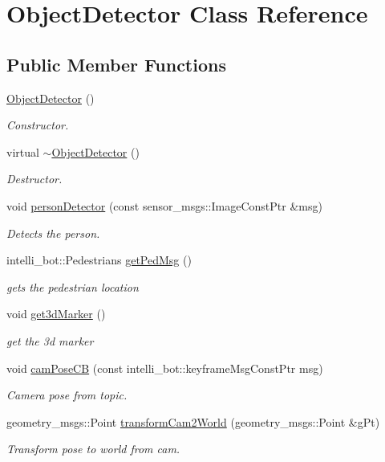 \hypertarget{class_object_detector}{}\section{Object\+Detector Class Reference}
\label{class_object_detector}
\subsection*{Public Member Functions}
\begin{DoxyCompactItemize}
\item 
\hyperlink{class_object_detector_a604cad611c81493d4e376b3d1fe186f3}{Object\+Detector} ()
\begin{DoxyCompactList}\small\item\em Constructor. \end{DoxyCompactList}\item 
virtual \hyperlink{class_object_detector_abb6cdeb1969ccb681c424663fb687fe8}{$\sim$\+Object\+Detector} ()
\begin{DoxyCompactList}\small\item\em Destructor. \end{DoxyCompactList}\item 
void \hyperlink{class_object_detector_a9cd06c7452a78b43f5402d0abbe74ec0}{person\+Detector} (const sensor\+\_\+msgs\+::\+Image\+Const\+Ptr \&msg)
\begin{DoxyCompactList}\small\item\em Detects the person. \end{DoxyCompactList}\item 
intelli\+\_\+bot\+::\+Pedestrians \hyperlink{class_object_detector_ad421533951016a3b62469034bbdf6dbe}{get\+Ped\+Msg} ()
\begin{DoxyCompactList}\small\item\em gets the pedestrian location \end{DoxyCompactList}\item 
void \hyperlink{class_object_detector_a25d82371ea55a59380d3fdb0aead7c13}{get3d\+Marker} ()
\begin{DoxyCompactList}\small\item\em get the 3d marker \end{DoxyCompactList}\item 
void \hyperlink{class_object_detector_af5d1106f08a63d4531952d040c085d65}{cam\+Pose\+CB} (const intelli\+\_\+bot\+::keyframe\+Msg\+Const\+Ptr msg)
\begin{DoxyCompactList}\small\item\em Camera pose from topic. \end{DoxyCompactList}\item 
geometry\+\_\+msgs\+::\+Point \hyperlink{class_object_detector_aded1bf6bd0acb1f4116a7bd267dd7461}{transform\+Cam2\+World} (geometry\+\_\+msgs\+::\+Point \&g\+Pt)
\begin{DoxyCompactList}\small\item\em Transform pose to world from cam. \end{DoxyCompactList}\end{DoxyCompactItemize}


